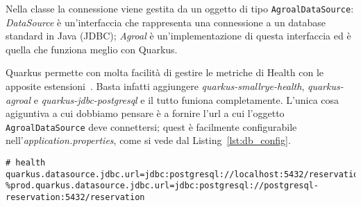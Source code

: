 \myskip

Nella classe la connessione viene gestita da un oggetto di tipo \texttt{AgroalDataSource}\cite{quarkus_datasource}: \textit{DataSource} è un'interfaccia che rappresenta una connessione a un database standard in Java (JDBC); \textit{Agroal} è un'implementazione di questa interfaccia ed è quella che funziona meglio con Quarkus.

Quarkus permette con molta facilità di gestire le metriche di Health con le apposite estensioni~\cite{quarkus_health}. Basta infatti aggiungere \textit{quarkus-smallrye-health}, \textit{quarkus-agroal} e \textit{quarkus-jdbc-postgresql} e il tutto funiona completamente. L'unica cosa agiguntiva a cui dobbiamo pensare è a fornire l'url a cui l'oggetto \texttt{AgroalDataSource} deve connettersi; quest è facilmente configurabile nell'\textit{application.properties}, come si vede dal Listing~\ref{lst:db_config}.
\begin{lstlisting}[caption=JDBC configuration., label=lst:db_config]
# health
quarkus.datasource.jdbc.url=jdbc:postgresql://localhost:5432/reservation
%prod.quarkus.datasource.jdbc.url=jdbc:postgresql://postgresql-reservation:5432/reservation
\end{lstlisting}